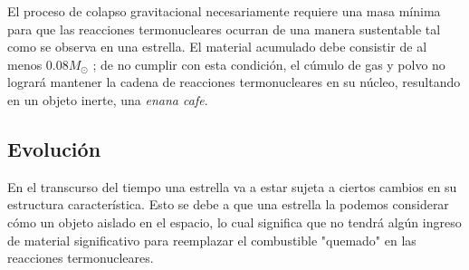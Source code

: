 
El proceso de colapso gravitacional necesariamente requiere una masa mínima para
que las reacciones termonucleares ocurran de una manera sustentable tal como se
observa en una estrella. El material acumulado debe consistir de al menos $0.08
M_{\odot}$ \citet*{anIntroStellarAstro::chapter2_stellarFormation}; de no
cumplir con esta condición, el cúmulo de gas y polvo no logrará mantener la
cadena de reacciones termonucleares en su núcleo, resultando en un objeto
inerte, una \textit{enana cafe}.

\subsection{Evolución}

En el transcurso del tiempo una estrella va a estar sujeta a ciertos cambios en su estructura característica. Esto se debe a que una estrella la podemos considerar cómo un objeto aislado en el espacio, lo cual significa que no tendrá algún ingreso de material significativo para reemplazar el combustible "quemado" en las reacciones termonucleares. 